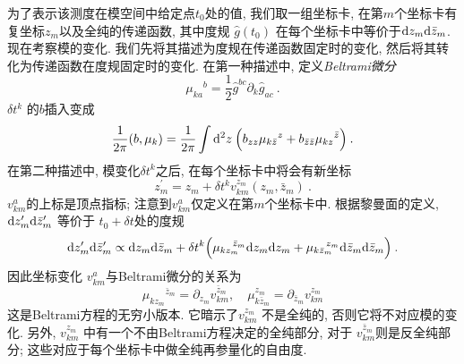 为了表示该测度在模空间中给定点$t_{0}$处的值, 我们取一组坐标卡, 在第$m$个坐标卡有复坐标$z_{m}$以及全纯的传递函数, 
其中度规 $\hat{g}(t_{0})$ 在每个坐标卡中等价于$\mathrm{d} z_{m} \mathrm{d} \bar{z}_{m}$. 现在考察模的变化. 
我们先将其描述为度规在传递函数固定时的变化, 然后将其转化为传递函数在度规固定时的变化. 在第一种描述中, 定义\emph{Beltrami微分}
\begin{equation}
	\mu_{k a}{}^{b}=\frac{1}{2} \hat{g}^{b c} \partial_{k} \hat{g}_{a c} \:. \label{5.4.7}
\end{equation}
 $\delta t^{k}$ 的$b$插入变成
\begin{equation}
	\frac{1}{2 \pi}(b, \mu_{k})=\frac{1}{2 \pi} \int \mathrm{d}^{2} z\: \Bigl(b_{z z} \mu_{k \bar{z}}{}^{z}+b_{\bar{z} \bar{z}} \mu_{k z}{}^{\bar{z}}\Bigr) \:. \label{5.4.8}
\end{equation}
在第二种描述中, 模变化$\delta t^{k}$之后, 在每个坐标卡中将会有新坐标
\begin{equation}
	z_{m}^{\prime}=z_{m}+\delta t^{k} v_{k m}^{z_{m}}(z_{m}, \bar{z}_{m}) \:. \label{5.4.9}
\end{equation}
$v_{k m}^{a}$的上标是顶点指标; 注意到$v_{k m}^{a}$仅定义在第$m$个坐标卡中. 根据黎曼面的定义, 
$\mathrm{d} z_{m}^{\prime} \mathrm{d} \bar{z}_{m}^{\prime}$ 等价于 $t_{0}+\delta t$处的度规
\begin{equation}
	\dif z_{m}^{\prime} \dif \bar{z}_{m}^{\prime} \propto \dif z_{m} \dif \bar{z}_{m}+\delta t^{k}
	\Bigl(\mu_{k z_{m}}{}^{\!\!\!\!\bar{z}_{m}} \dif z_{m} \dif z_{m}+\mu_{k \bar{z}_{m}}{}^{\!\!\!\!z_{m}} \dif \bar{z}_{m} \dif \bar{z}_{m}\Bigr) \:. \label{5.4.10}
\end{equation}
因此坐标变化 $v_{k m}^{a}$与Beltrami微分的关系为
\begin{equation}
	\mu_{k z_{m}}{}^{\!\!\!\!\bar{z}_{m}}=\partial_{z_{m}} v_{k m}^{\bar{z}_{m}}, \quad \mu_{k \bar{z}_{m}}^{z_{m}}=\partial_{\bar{z}_{m}} v_{k m}^{z_{m}}
\end{equation}
这是Beltrami方程的无穷小版本. 它暗示了$v_{k m}^{z_{m}}$ 不是全纯的, 否则它将不对应模的变化. 
另外, $v_{k m}^{z_{m}}$ 中有一个不由Beltrami方程决定的全纯部分, 对于 $v_{k m}^{\bar{z}_{m}}$则是反全纯部分; 
这些对应于每个坐标卡中做全纯再参量化的自由度.

